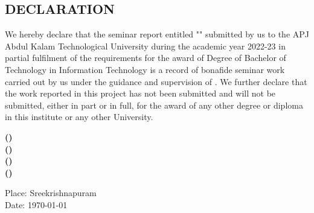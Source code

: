 \begin{titlepage}
\chapter*{DECLARATION}
\thispagestyle{empty}

\noindent We hereby declare that the seminar report entitled "{\textbf{\cTitle}}" submitted by us to the APJ Abdul Kalam Technological University during the academic year 2022-23 in partial fulfilment of the requirements for the award of Degree of Bachelor of Technology in Information Technology is a record of bonafide seminar work carried out by us under the guidance and supervision of \cGuide. We further declare that the work reported in this project has not been submitted and will not be submitted, either in part or in full, for the award of any other degree or diploma in this institute or any other University.

\vspace{2cm}

\begin{flushright}
\textbf{\MakeUppercase{\cMembOne} (\cMembOneRegNo)} \\
\textbf{\MakeUppercase{\cMembTwo} (\cMembTwoRegNo)} \\ 
\textbf{\MakeUppercase{\cMembThree} (\cMembThreeRegNo)} \\
\textbf{\MakeUppercase{\cMembFour} (\cMembFourRegNo)}
\end{flushright}

\noindent Place: Sreekrishnapuram \\
Date: \today

\end{titlepage}